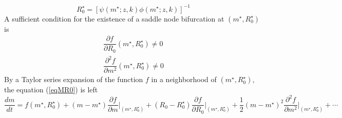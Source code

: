 \documentclass[12pt,a4paper]{article}
\theoremstyle{plain}%
\theoremstyle{definition}
\theoremstyle{remark}
\begin{document}
\begin{equation}
R_0^{\star}=\left[ \psi(m^{\star};z,k)\phi(m^{\star};z,k)\right]^{-1}
\end{equation}	
A sufficient condition for the existence of a saddle node bifurcation at $(m^{\star},R_0^{\star})$ is
\begin{equation}
\begin{split}
\dfrac{\partial f }{\partial R_0}(m^{\star},R_0^{\star})\neq0\\
\dfrac{\partial^2 f }{\partial m^2}(m^{\star},R_0^{\star})\neq0
\end{split}
\end{equation}
By a Taylor series expansion of the function $f$ in a neighborhood of $(m^{\star},R_0^{\star})$, the equation (\ref{eqMR0}) is left
\begin{equation}
{\scriptstyle	\frac{dm}{dt}=f(m^{\star},R_0^{\star})+(m-m^{\star})\frac{\partial f }{\partial m}\big\vert_{(m^{\star},R_0^{\star})}%
	+(R_0-R_0^{\star}){\frac{\partial f }{\partial R_0}\big\vert_{(m^{\star},R_0^{\star})}}%
	+{\frac {1}{2}}(m-m^{\star})^2{\frac{\partial^2 f }{\partial m^2}}\big\vert_{(m^{\star},R_0^{\star})}%
	+\cdots }
\end{equation}
\end{document}
